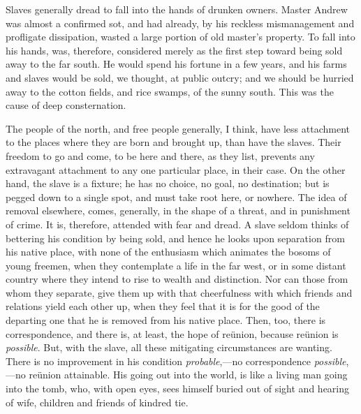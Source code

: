 Slaves generally dread to fall into the hands of drunken owners. Master
Andrew was almost a confirmed sot, and had already, by his reckless
mismanagement and profligate dissipation, wasted a large portion of old
master's property. To fall into his hands, was, therefore, considered
merely as the first step toward being sold away to the far south. He
would spend his fortune in a few years, and his farms and slaves would
be sold, we thought, at public outcry; and we should be hurried away to
the cotton fields, and rice swamps, of the sunny south. This was the
cause of deep consternation.

The people of the north, and free people generally, I think, have less
attachment to the places where they are born and brought up, than have
the slaves. Their freedom to go and come, to be here and there, as they
list, prevents any extravagant attachment to any one particular place,
in their case. On the other hand, the slave is a fixture; he has no
choice, no goal, no destination; but is pegged down to a single spot,
and must take root here, or nowhere. The idea of removal elsewhere,
comes, generally, in the shape of a threat, and in punishment of crime.
It is, therefore, attended with fear and dread. A slave seldom thinks of
bettering his condition by being sold, and hence he looks upon
separation from his native place, with {}none of the enthusiasm which
animates the bosoms of young freemen, when they contemplate a life in
the far west, or in some distant country where they intend to rise to
wealth and distinction. Nor can those from whom they separate, give them
up with that cheerfulness with which friends and relations yield each
other up, when they feel that it is for the good of the departing one
that he is removed from his native place. Then, too, there is
correspondence, and there is, at least, the hope of reünion, because
reünion is \emph{possible}. But, with the slave, all these mitigating
circumstances are wanting. There is no improvement in his condition
\emph{probable},---no correspondence \emph{possible},---no reünion
attainable. His going out into the world, is like a living man going
into the tomb, who, with open eyes, sees himself buried out of sight and
hearing of wife, children and friends of kindred tie.

